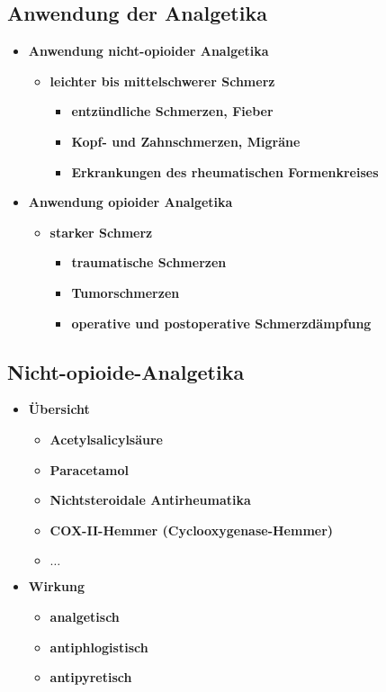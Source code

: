 \subsection{Anwendung der Analgetika}
	\begin{itemize}
		\item \textbf{Anwendung nicht-opioider Analgetika}
			\begin{itemize}
				\item \textbf{leichter bis mittelschwerer Schmerz}
					\begin{itemize}
						\item \textbf{entzündliche Schmerzen, Fieber}
						\item \textbf{Kopf- und Zahnschmerzen, Migräne}
						\item \textbf{Erkrankungen des rheumatischen Formenkreises}
					\end{itemize}
			\end{itemize}
		\item \textbf{Anwendung opioider Analgetika}
			\begin{itemize}
				\item \textbf{starker Schmerz}
					\begin{itemize}
						\item \textbf{traumatische Schmerzen}
						\item \textbf{Tumorschmerzen}
						\item \textbf{operative und postoperative Schmerzdämpfung}
					\end{itemize}
			\end{itemize}
	\end{itemize}

\subsection{Nicht-opioide-Analgetika}
	\begin{itemize}
		\item \textbf{Übersicht}
			\begin{itemize}
				\item \textbf{Acetylsalicylsäure}
				\item \textbf{Paracetamol}
				\item \textbf{Nichtsteroidale Antirheumatika}
				\item \textbf{COX-II-Hemmer (Cyclooxygenase-Hemmer)}
				\item \textbf{$\dots$}
			\end{itemize}
		\item \textbf{Wirkung}
			\begin{itemize}
				\item \textbf{analgetisch}
				\item \textbf{antiphlogistisch}
				\item \textbf{antipyretisch}
			\end{itemize}
	\end{itemize}
				
